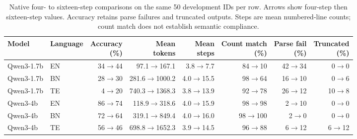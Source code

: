\begin{table}[t]
\centering
\small
\setlength{\tabcolsep}{4pt}
\begin{tabular}{llrrrrrr}
\toprule
Model & Language & \shortstack{Accuracy\\(\%)} & \shortstack{Mean\\tokens} & \shortstack{Mean\\steps} & \shortstack{Count match\\(\%)} & \shortstack{Parse fail\\(\%)} & \shortstack{Truncated\\(\%)} \\
\midrule
Qwen3-1.7b & EN & 34$\to$44 & 97.1$\to$167.1 & 3.8$\to$7.7 & 84$\to$10 & 42$\to$34 & 0$\to$0 \\
Qwen3-1.7b & BN & 28$\to$30 & 281.6$\to$1000.2 & 4.0$\to$15.5 & 98$\to$64 & 16$\to$10 & 0$\to$6 \\
Qwen3-1.7b & TE & 4$\to$20 & 740.3$\to$1368.3 & 3.8$\to$13.9 & 92$\to$78 & 26$\to$12 & 10$\to$8 \\
Qwen3-4b & EN & 86$\to$74 & 118.9$\to$318.6 & 4.0$\to$15.9 & 98$\to$98 & 2$\to$10 & 0$\to$0 \\
Qwen3-4b & BN & 72$\to$64 & 319.1$\to$849.4 & 4.0$\to$16.0 & 98$\to$100 & 2$\to$0 & 0$\to$0 \\
Qwen3-4b & TE & 56$\to$46 & 698.8$\to$1652.3 & 3.9$\to$14.5 & 96$\to$88 & 6$\to$12 & 6$\to$12 \\
\bottomrule
\end{tabular}
\caption{Native four- to sixteen-step comparisons on the same 50 development IDs per row. Arrows show four-step then sixteen-step values. Accuracy retains parse failures and truncated outputs. Steps are mean numbered-line counts; count match does not establish semantic compliance.}
\label{tab:pilot-native}
\end{table}
